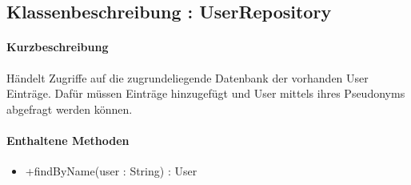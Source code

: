 \subsection{Klassenbeschreibung : UserRepository}%
\paragraph*{Kurzbeschreibung}
Händelt Zugriffe auf die zugrundeliegende Datenbank der vorhanden User Einträge.
Dafür müssen Einträge hinzugefügt und User mittels ihres Pseudonyms abgefragt werden können.
\paragraph*{Enthaltene Methoden}
\begin{itemize}
    \item +findByName(user : String) : User
\end{itemize}